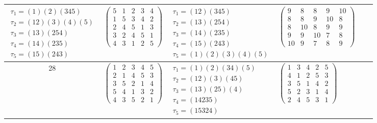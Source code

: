 \begin{longtable}{|c|p{2.7cm}|p{2.7cm}|p{2.7cm}|p{2.7cm}|p{3.3cm}|}
    $\begin{array}{l}\tau_{1}=(1)(2)(345)\\ \tau_{2}=(12)(3)(4)(5)\\ \tau_{3}=(13)(254)\\ \tau_{4}=(14)(235)\\ \tau_{5}=(15)(243)\end{array}$   &
    $\begin{pmatrix}5&1&2&3&4\\1&5&3&4&2\\2&4&5&1&3\\3&2&4&5&1\\4&3&1&2&5\end{pmatrix}$                                                         &
    $\begin{array}{l}\tau_{1}=(12)(345)\\ \tau_{2}=(13)(254)\\ \tau_{3}=(14)(235)\\ \tau_{4}=(15)(243)\\ \tau_{5}=(1)(2)(3)(4)(5)\end{array}$   &
    $\begin{pmatrix}9&8&8&9&10\\8&8&9&10&8\\8&10&8&9&9\\9&9&10&7&8\\10&9&7&8&9\end{pmatrix}$                                                                                                                                \\
    \hline
    28                                                                                                                                          &
    $\begin{pmatrix}1&2&3&4&5\\2&1&4&5&3\\3&5&2&1&4\\5&4&1&3&2\\4&3&5&2&1\end{pmatrix}$                                                         &
    $\begin{array}{l}\tau_{1}=(1)(2)(34)(5)\\ \tau_{2}=(12)(3)(45)\\ \tau_{3}=(13)(25)(4)\\ \tau_{4}=(14235)\\ \tau_{5}=(15324)\end{array}$     &
    $\begin{pmatrix}1&3&4&2&5\\4&1&2&5&3\\3&5&1&4&2\\5&2&3&1&4\\2&4&5&3&1\end{pmatrix}$                                                         &

\end{longtable}
